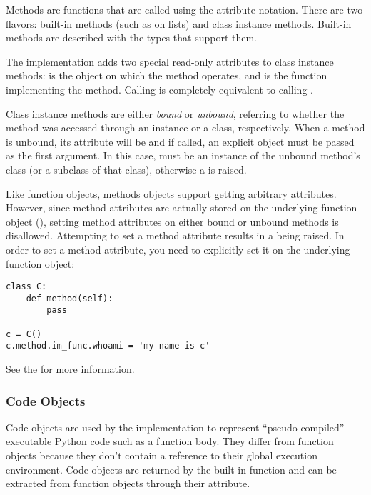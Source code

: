 Methods are functions that are called using the attribute notation.
There are two flavors: built-in methods (such as  on
lists) and class instance methods.  Built-in methods are described
with the types that support them.

The implementation adds two special read-only attributes to class
instance methods:  is the object on which the
method operates, and  is the function
implementing the method.  Calling  is completely equivalent to
calling .

Class instance methods are either \emph{bound} or \emph{unbound},
referring to whether the method was accessed through an instance or a
class, respectively.  When a method is unbound, its 
attribute will be  and if called, an explicit 
object must be passed as the first argument.  In this case,
 must be an instance of the unbound method's class (or a
subclass of that class), otherwise a  is raised.

Like function objects, methods objects support getting
arbitrary attributes.  However, since method attributes are actually
stored on the underlying function object (),
setting method attributes on either bound or unbound methods is
disallowed.  Attempting to set a method attribute results in a
 being raised.  In order to set a method attribute,
you need to explicitly set it on the underlying function object:

\begin{verbatim}
class C:
    def method(self):
        pass

c = C()
c.method.im_func.whoami = 'my name is c'
\end{verbatim}

See the  for more
information.


\subsubsection{Code Objects \label{bltin-code-objects}}

Code objects are used by the implementation to represent
``pseudo-compiled'' executable Python code such as a function body.
They differ from function objects because they don't contain a
reference to their global execution environment.  Code objects are
returned by the built-in  function and can be
extracted from function objects through their 
attribute.

